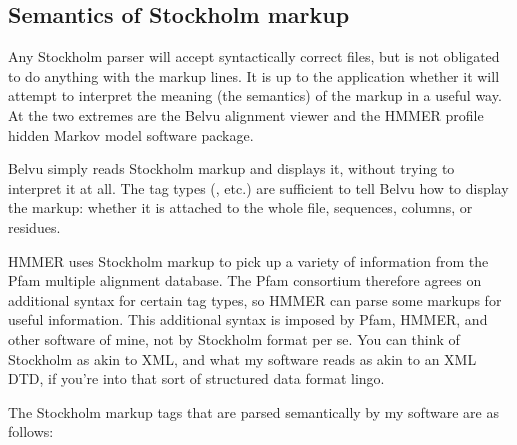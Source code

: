 \subsection{Semantics of Stockholm markup}

Any Stockholm parser will accept syntactically correct files, but is
not obligated to do anything with the markup lines. It is up to the
application whether it will attempt to interpret the meaning (the
semantics) of the markup in a useful way. At the two extremes are the
Belvu alignment viewer and the HMMER profile hidden Markov model
software package.

Belvu simply reads Stockholm markup and displays it, without trying to
interpret it at all. The tag types (, etc.) are sufficient
to tell Belvu how to display the markup: whether it is attached to the
whole file, sequences, columns, or residues.

HMMER uses Stockholm markup to pick up a variety of information from
the Pfam multiple alignment database. The Pfam consortium therefore
agrees on additional syntax for certain tag types, so HMMER can parse
some markups for useful information. This additional syntax is imposed
by Pfam, HMMER, and other software of mine, not by Stockholm format
per se. You can think of Stockholm as akin to XML, and what my
software reads as akin to an XML DTD, if you're into that sort of
structured data format lingo.

The Stockholm markup tags that are parsed semantically by my software
are as follows:


